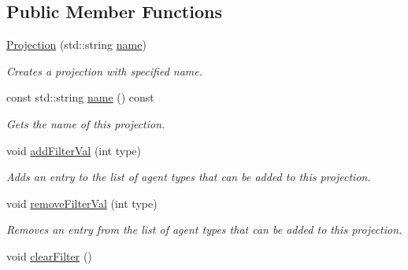 \subsection*{Public Member Functions}
\begin{DoxyCompactItemize}
\item 
\hyperlink{classrepast_1_1_projection_a2c5c9f33cf57c5e7a00402eab2080051}{Projection} (std\-::string \hyperlink{classrepast_1_1_projection_ab60a0ab4f584685780307d7431b61800}{name})
\begin{DoxyCompactList}\small\item\em Creates a projection with specified name. \end{DoxyCompactList}\item 
\hypertarget{classrepast_1_1_projection_ab60a0ab4f584685780307d7431b61800}{const std\-::string \hyperlink{classrepast_1_1_projection_ab60a0ab4f584685780307d7431b61800}{name} () const }\label{classrepast_1_1_projection_ab60a0ab4f584685780307d7431b61800}

\begin{DoxyCompactList}\small\item\em Gets the name of this projection. \end{DoxyCompactList}\item 
void \hyperlink{classrepast_1_1_projection_a340bcbf86f1e29489b9ca1a4aa5e9298}{add\-Filter\-Val} (int type)
\begin{DoxyCompactList}\small\item\em Adds an entry to the list of agent types that can be added to this projection. \end{DoxyCompactList}\item 
void \hyperlink{classrepast_1_1_projection_ab4587f793b1c250de22af16fedf7f89d}{remove\-Filter\-Val} (int type)
\begin{DoxyCompactList}\small\item\em Removes an entry from the list of agent types that can be added to this projection. \end{DoxyCompactList}\item 
\hypertarget{classrepast_1_1_projection_a35eae2c3351ef0de242a2ebeac8719df}{void \hyperlink{classrepast_1_1_projection_a35eae2c3351ef0de242a2ebeac8719df}{clear\-Filter} ()}\label{classrepast_1_1_projection_a35eae2c3351ef0de242a2ebeac8719df}


\end{DoxyCompactItemize}

